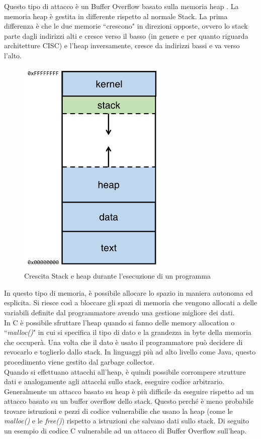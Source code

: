 Questo tipo di attacco è un Buffer Overflow basato sulla memoria heap \cite{HeapMemory}.
La memoria heap è gestita in differente rispetto al normale Stack. La prima differenza è che le due memorie ``crescono" in direzioni opposte, ovvero lo stack parte dagli indirizzi alti e cresce verso il basso (in genere e per quanto riguarda architetture CISC) e l'heap inversamente, cresce da indirizzi bassi e va verso l'alto.

\vspace{1cm}
\FloatBarrier
\begin{figure}[!htbp]
    \centering
    \includegraphics[width=0.3\linewidth]{images/stack-and-heap.png}
    \caption{Crescita Stack e heap durante l'esecuzione di un programma}
\end{figure}
\FloatBarrier
\vspace{1cm}

In questo tipo di memoria, è possibile allocare lo spazio in maniera autonoma ed esplicita. Si riesce così a bloccare gli spazi di memoria che vengono allocati a delle variabili definite dal programmatore avendo una gestione migliore dei dati. \\
\newline
In C è possibile sfruttare l'heap quando si fanno delle memory allocation o ``\textit{malloc()}" in cui si specifica il tipo di dato e la grandezza in byte della memoria che occuperà. Una volta che il dato è usato il programmatore può decidere di revocarlo e toglierlo dallo stack. In linguaggi più ad alto livello come Java, questo procedimento viene gestito dal garbage collector. \\
\newline
Quando si effettuano attacchi all'heap, è quindi possibile corrompere strutture dati e analogamente agli attacchi sullo stack, eseguire codice arbitrario. \\
Generalmente un attacco basato su heap è più difficile da eseguire rispetto ad un attacco basato su un buffer overflow dello stack. Questo perché è meno probabile trovare istruzioni e pezzi di codice vulnerabilie che usano la heap (come le \textit{malloc()} e le \textit{free()}) rispetto a istruzioni che salvano dati sullo stack.
Di seguito un esempio di codice C vulnerabile ad un attacco di Buffer Overflow sull'heap.

